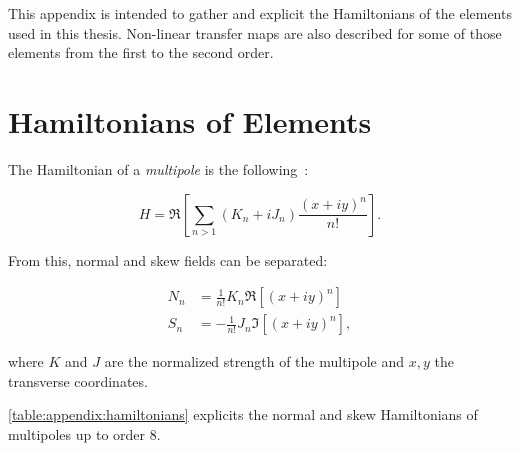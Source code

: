 This appendix is intended to gather and explicit the Hamiltonians of the elements used in this 
thesis. Non-linear transfer maps are also described for some of those elements from the first to
the second order.

\section{Hamiltonians of Elements}

The Hamiltonian of a \textit{multipole} is the
following~\cite{keintzel_jacqueline_beam_nodate,tomas_direct_2003,franchi_studies_2006}:

\begin{equation}
    H = \Re \left[ \sum_{n>1} (K_n + iJ_n) \frac{(x+iy)^n}{n!} \right].
\end{equation}

From this, normal and skew fields can be separated:

\begin{equation}
    \begin{aligned}
        N_n &= \frac{1}{n!} K_n \Re \left[ (x+iy)^n \right] \\
        S_n &= -\frac{1}{n!} J_n \Im \left[ (x+iy)^n \right],
    \end{aligned}
\end{equation}

where $K$ and $J$ are the normalized strength of the multipole and $x,y$ the transverse coordinates.

\cref{table:appendix:hamiltonians} explicits the normal and skew Hamiltonians of multipoles up to
order 8.

